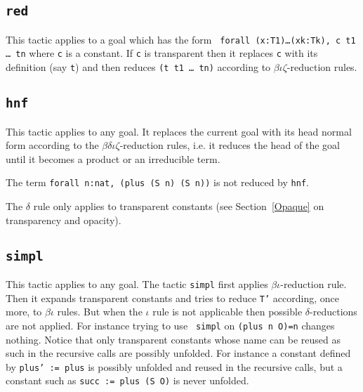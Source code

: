 \begin{coq_example*}
\subsection{{\tt red}
}

This tactic applies to a goal which has the form {\tt
  forall (x:T1)\dots(xk:Tk), c t1 \dots\ tn} where {\tt c} is a constant.  If
{\tt c} is transparent then it replaces {\tt c} with its definition
(say {\tt t}) and then reduces {\tt (t t1 \dots\ tn)} according to
$\beta\iota\zeta$-reduction rules.

\begin{ErrMsgs}
\item {}
\end{ErrMsgs}

\subsection{{\tt hnf}
}

This tactic applies to any goal. It replaces the current goal with its
head normal form according to the $\beta\delta\iota\zeta$-reduction
rules, i.e.  it reduces the head of the goal until it becomes a
product or an irreducible term.

\Example
The term \verb+forall n:nat, (plus (S n) (S n))+ is not reduced by {\tt hnf}.

\Rem The $\delta$ rule only applies to transparent constants
(see Section~\ref{Opaque} on transparency and opacity).

\subsection{\tt simpl
}

This tactic applies to any goal. The tactic {\tt simpl} first applies
$\beta\iota$-reduction rule.  Then it expands transparent constants
and tries to reduce {\tt T'} according, once more, to $\beta\iota$
rules. But when the $\iota$ rule is not applicable then possible
$\delta$-reductions are not applied.  For instance trying to use {\tt
simpl} on {\tt (plus n O)=n} changes nothing.  Notice that only
transparent constants whose name can be reused as such in the
recursive calls are possibly unfolded. For instance a constant defined
by {\tt plus' := plus} is possibly unfolded and reused in the
recursive calls, but a constant such as {\tt succ := plus (S O)} is
never unfolded.


\end{coq_example*}
